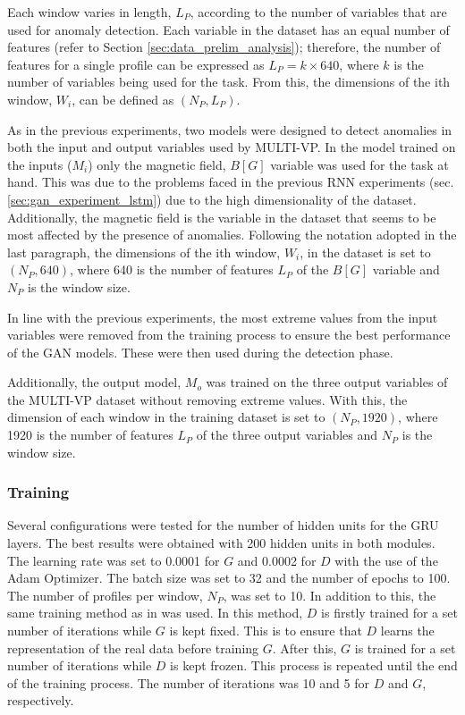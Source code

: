 Each window varies in length, $L_P$, according to the number of variables that are used for anomaly detection. Each variable in the dataset has an equal number of features (refer to Section \ref{sec:data_prelim_analysis}); therefore, the number of features for a single profile can be expressed as $L_P=k\times 640$, where $k$ is the number of variables being used for the task. From this, the dimensions of the ith window, $W_i$, can be defined as $(N_P, L_P)$.

As in the previous experiments, two models were designed to detect anomalies in both the input and output variables used by MULTI-VP. In the model trained on the inputs ($M_i$) only the magnetic field, $B [G]$ variable was used for the task at hand. This was due to the problems faced in the previous RNN experiments (sec. \ref{sec:gan_experiment_lstm}) due to the high dimensionality of the dataset. Additionally, the magnetic field is the variable in the dataset that seems to be most affected by the presence of anomalies. Following the notation adopted in the last paragraph, the dimensions of the ith window, $W_{i}$, in the dataset is set to $(N_P, 640)$, where 640 is the number of features $L_P$ of the $B [G]$ variable and $N_P$ is the window size.

In line with the previous experiments, the most extreme values from the input variables were removed from the training process to ensure the best performance of the GAN models. These were then used during the detection phase.

Additionally, the output model, $M_o$ was trained on the three output variables of the MULTI-VP dataset without removing extreme values. With this, the dimension of each window in the training dataset is set to $(N_P, 1920)$, where 1920 is the number of features $L_P$ of the three output variables and $N_P$ is the window size.

\subsubsection*{Training}
Several configurations were tested for the number of hidden units for the GRU layers. The best results were obtained with 200 hidden units in both modules. The learning rate was set to 0.0001 for $G$ and 0.0002 for $D$ with the use of the Adam Optimizer. The batch size was set to 32 and the number of epochs to 100. The number of profiles per window, $N_P$, was set to 10. In addition to this, the same training method as in \cite{li.etal_MADGANMultivariateAnomaly_2019} was used. In this method, $D$ is firstly trained for a set number of iterations while $G$ is kept fixed. This is to ensure that $D$ learns the representation of the real data before training $G$. After this, $G$ is trained for a set number of iterations while $D$ is kept frozen. This process is repeated until the end of the training process. The number of iterations was 10 and 5 for $D$ and $G$, respectively.


